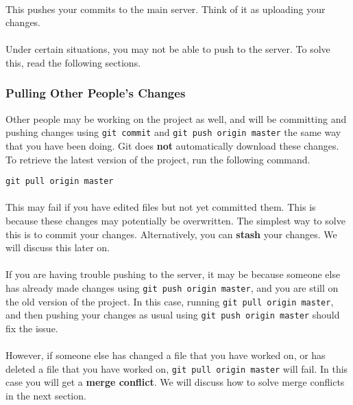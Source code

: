 \documentclass[11pt]{article}
\begin{document}
\paragraph{}
This pushes your commits to the main server. Think of it as uploading your changes.
\paragraph{}
Under certain situations, you may not be able to push to the server. To solve this, read the following sections.
\subsubsection{Pulling Other People's Changes}
Other people may be working on the project as well, and will be committing and pushing changes using \lstinline{git commit} and \lstinline{git push origin master} the same way that you have been doing. Git does \textbf{not} automatically download these changes. To retrieve the latest version of the project, run the following command.
\begin{lstlisting}
git pull origin master
\end{lstlisting}
\paragraph{}
This may fail if you have edited files but not yet committed them. This is because these changes may potentially be overwritten. The simplest way to solve this is to commit your changes. Alternatively, you can \textbf{stash} your changes. We will discuss this later on.
\paragraph{}
If you are having trouble pushing to the server, it may be because someone else has already made changes using \lstinline{git push origin master}, and you are still on the old version of the project. In this case, running \lstinline{git pull origin master}, and then pushing your changes as usual using \lstinline{git push origin master} should fix the issue.
\paragraph{}
However, if someone else has changed a file that you have worked on, or has deleted a file that you have worked on, \lstinline{git pull origin master} will fail. In this case you will get a \textbf{merge conflict}. We will discuss how to solve merge conflicts in the next section.
\end{document}
